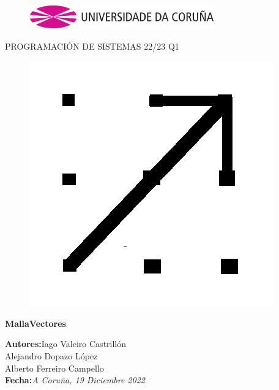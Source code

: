 \documentclass[a4paper,openright,12pt]{article}
\begin{document}
\begin{titlepage}
    \begin{center}
        \vspace*{-1in}
        \begin{figure}[htb]
            \begin{center}
                \includegraphics[width=8cm]{udc.eps}
            \end{center}
        \end{figure}

        \vspace*{1in}
        PROGRAMACIÓN DE SISTEMAS 22/23 Q1\\
        \begin{figure}[htb]
            \begin{center}
                \includegraphics{icon.png}
            \end{center}
        \end{figure}
        \vspace*{1in}
        \begin{Large}
            \textbf{MallaVectores} \\
        \end{Large}
        
        \vspace*{3in}
        
        \begin{large}
            \raggedleft
            \textbf{Autores:}Iago Valeiro Castrillón \\
            Alejandro Dopazo López \\
            Alberto Ferreiro Campello \\
            \textbf{Fecha:}\textit{A Coruña, 19 Diciembre 2022} \\
        \end{large}
        
    \end{center}
\end{titlepage} 
\end{document}
